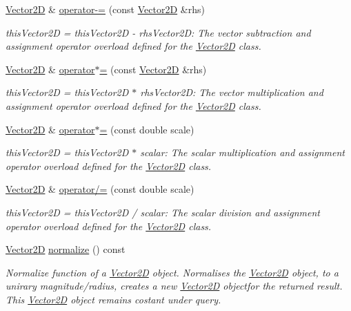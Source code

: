 \begin{DoxyCompactItemize}
\hyperlink{class_vector2_d}{Vector2D} \& \hyperlink{class_vector2_d_a16532303ee3e0a340f0515c1f0675fbd}{operator-\/=} (const \hyperlink{class_vector2_d}{Vector2D} \&rhs)
\begin{DoxyCompactList}\small\item\em this\+Vector2D = this\+Vector2D -\/ rhs\+Vector2D\+: The vector subtraction and assignment operator overload defined for the \hyperlink{class_vector2_d}{Vector2D} class. \end{DoxyCompactList}\item 
\hyperlink{class_vector2_d}{Vector2D} \& \hyperlink{class_vector2_d_a7fe58ba3258641c02c7ea4499d42a089}{operator$\ast$=} (const \hyperlink{class_vector2_d}{Vector2D} \&rhs)
\begin{DoxyCompactList}\small\item\em this\+Vector2D = this\+Vector2D $\ast$ rhs\+Vector2D\+: The vector multiplication and assignment operator overload defined for the \hyperlink{class_vector2_d}{Vector2D} class. \end{DoxyCompactList}\item 
\hyperlink{class_vector2_d}{Vector2D} \& \hyperlink{class_vector2_d_abd5d60f6e25137acab01b1d82da6819a}{operator$\ast$=} (const double scale)
\begin{DoxyCompactList}\small\item\em this\+Vector2D = this\+Vector2D $\ast$ scalar\+: The scalar multiplication and assignment operator overload defined for the \hyperlink{class_vector2_d}{Vector2D} class. \end{DoxyCompactList}\item 
\hyperlink{class_vector2_d}{Vector2D} \& \hyperlink{class_vector2_d_a72a388dec12b808190830a35be86a1f7}{operator/=} (const double scale)
\begin{DoxyCompactList}\small\item\em this\+Vector2D = this\+Vector2D / scalar\+: The scalar division and assignment operator overload defined for the \hyperlink{class_vector2_d}{Vector2D} class. \end{DoxyCompactList}\item 
\hyperlink{class_vector2_d}{Vector2D} \hyperlink{class_vector2_d_a79cfa577c38cb866d088166d6729a47d}{normalize} () const
\begin{DoxyCompactList}\small\item\em Normalize function of a \hyperlink{class_vector2_d}{Vector2D} object. Normalises the \hyperlink{class_vector2_d}{Vector2D} object, to a unirary magnitude/radius, creates a new \hyperlink{class_vector2_d}{Vector2D} objectfor the returned result. This \hyperlink{class_vector2_d}{Vector2D} object remains costant under query. \end{DoxyCompactList}\end{DoxyCompactItemize}
